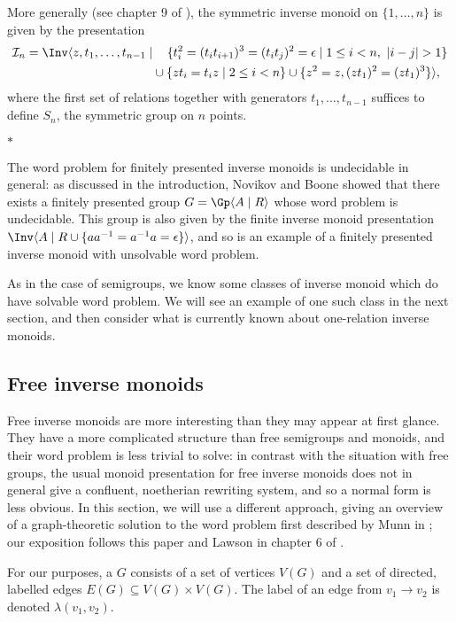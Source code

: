 \documentclass[noindex,noinsetproof,emphthm,12pt]{lmaths}
\newcommand{\paradec}{\par\begin{center}$\ast$\end{center}}
\begin{document}
More generally (see chapter 9 of \cite{Lipscomb1996}), the symmetric inverse monoid on $\{1, \ldots, n\}$ is given by the presentation
\begin{align*}
	\mathcal{I}_n = \Inv \langle z, t_1, \ldots, t_{n-1} \mid & \quad\, \{ t_i^2 = (t_i t_{i+1})^3 = (t_i t_j)^2 = \epsilon \mid 1 \le i < n,\ |i-j|>1 \} \\
	& \cup \{ zt_i = t_iz \mid 2 \le i < n \} \cup \{ z^2 = z, (zt_1)^2 = (zt_1)^3 \} \rangle,
\end{align*}
where the first set of relations together with generators $t_1, \ldots, t_{n-1}$ suffices to define $S_n$, the symmetric group on $n$ points.


\paradec

The word problem for finitely presented inverse monoids is undecidable in general: as discussed in the introduction, Novikov and Boone showed that there exists a finitely presented group $G = \Gp \langle A \mid R \rangle$ whose word problem is undecidable. This group is also given by the finite inverse monoid presentation $\Inv \langle A \mid R \cup \{ aa^{-1} = a^{-1}a = \epsilon \} \rangle$, and so is an example of a finitely presented inverse monoid with unsolvable word problem.

As in the case of semigroups, we know some classes of inverse monoid which do have solvable word problem. We will see an example of one such class in the next section, and then consider what is currently known about one-relation inverse monoids. 

\subsection{Free inverse monoids} \label{sec:free-inverse-monoids}
Free inverse monoids are more interesting than they may appear at first glance. They have a more complicated structure than free semigroups and monoids, and their word problem is less trivial to solve: in contrast with the situation with free groups, the usual monoid presentation for free inverse monoids does not in general give a confluent, noetherian rewriting system, and so a normal form is less obvious. In this section, we will use a different approach, giving an overview of a graph-theoretic solution to the word problem first described by Munn in \cite{Munn1974}; our exposition follows this paper and Lawson in chapter 6 of \cite{Lawson1998}.

For our purposes, a  $G$ consists of a set of vertices $V(G)$ and a set of directed, labelled edges $E(G) \subseteq V(G) \times V(G)$. The label of an edge from $v_1 \to v_2$ is denoted $\lambda(v_1, v_2)$.
\end{document}
